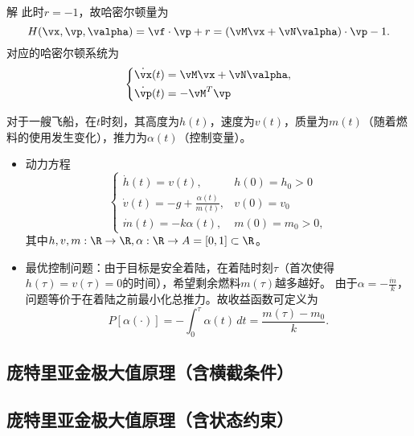 \begin{frame}{\subsecname}
\begin{block}{解}
此时$r=-1$，故哈密尔顿量为
 $$
 H(\vx,\vp,\valpha) = \vf\cdot \vp + r = (\vM\vx+\vN\valpha) \cdot \vp - 1.
 $$
 对应的哈密尔顿系统为
 $$
 \left\{
 \begin{aligned}
      \dot \vx(t) &= \vM\vx+\vN\valpha, \\
      \dot \vp(t) &=-\vM^T\vp 
 \end{aligned}
 \right.
 $$ 
\end{block}
   
\end{frame}

\begin{frame}{\subsecname}
\begin{example}[月球着陆]
对于一艘飞船，在$t$时刻，其高度为$h(t)$，速度为$v(t)$，质量为$m(t)$（随着燃料的使用发生变化），推力为$\alpha(t)$（控制变量）。
\begin{itemize}
 \item 动力方程 
 $$
 \left\{
 \begin{array}{ll}
      \dot h(t)=v(t), & h(0)=h_0>0\\[.05in]
      \dot v(t)=-g+\frac{\alpha(t)}{m(t)}, & v(0)=v_0\\[.05in]
      \dot m(t)=-k\alpha(t), & m(0)=m_0>0,
 \end{array}
 \right.
 $$
 其中$h,v,m:\R\to \R, \alpha:\R\to A=[0,1]\subset \R$。\\[.1in]
 \item 最优控制问题：由于目标是安全着陆，在着陆时刻$\tau$（首次使得$h(\tau)=v(\tau)=0$的时间），希望剩余燃料$m(\tau)$越多越好。 由于$\alpha=-\frac{\dot m}{k}$，问题等价于在着陆之前最小化总推力。故收益函数可定义为
 $$
 P[\alpha(\cdot)] = -\int_0^\tau \alpha(t) \,dt = \frac{m(\tau)-m_0}{k}.
 $$ 
 \end{itemize} 
\end{example}
\end{frame}
\subsection{庞特里亚金极大值原理（含横截条件）}


\subsection{庞特里亚金极大值原理（含状态约束）}


\begin{frame}{\subsecname}
  
   
  
\end{frame}



